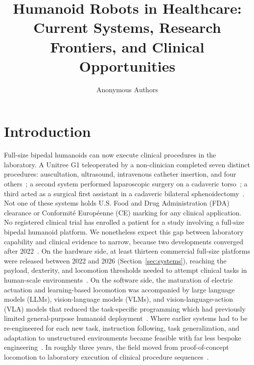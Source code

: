 \documentclass[acmsmall]{acmart}
\title{Humanoid Robots in Healthcare: Current Systems, Research Frontiers,
       and Clinical Opportunities}
\author{Anonymous Authors}
\begin{document}
\maketitle


\section{Introduction}
\label{sec:intro}

Full-size bipedal humanoids can now execute clinical procedures in the
laboratory. A Unitree G1 teleoperated by a non-clinician completed seven
distinct procedures: auscultation, ultrasound, intravenous catheter insertion,
and four others~\cite{atar2025humanoids}; a second system performed
laparoscopic surgery on a cadaveric torso~\cite{liang2025lapsurgie}; a third
acted as a surgical first assistant in a cadaveric bilateral
sphenoidectomy~\cite{cho2026humanoid}. Not one of these systems holds U.S. Food and Drug Administration (FDA)
clearance or Conformit\'{e} Europ\'{e}enne (CE) marking for any clinical
application. No registered clinical
trial has enrolled a patient for a study involving a full-size bipedal humanoid
platform. We nonetheless expect this gap between laboratory capability and
clinical evidence to narrow, because two developments converged after
2022~\cite{gu2025humanoid,cao2025humanoid}. On the hardware side, at least
thirteen commercial full-size platforms were released between 2022 and 2026
(Section~\ref{sec:systems}), reaching the payload, dexterity, and locomotion
thresholds needed to attempt clinical tasks in human-scale
environments~\cite{ifr2025humanoid,unitree2024g1,figureai2024unveils}. On the
software side, the maturation of electric actuation and learning-based
locomotion was accompanied by large language models (LLMs), vision-language
models (VLMs), and vision-language-action (VLA) models that reduced the
task-specific programming which had previously limited general-purpose humanoid
deployment~\cite{firoozi2025foundation,kawaharazuka2024realworld,kim2024survey}.
Where earlier systems had to be re-engineered for each new task, instruction
following, task generalization, and adaptation to unstructured environments
became feasible with far less bespoke
engineering~\cite{argall2009survey,ravichandar2020recent}. In roughly three
years, the field moved from proof-of-concept locomotion to laboratory execution
of clinical procedure
sequences~\cite{radosavovic2024realworld,atar2025humanoids,cho2026humanoid}.
\end{document}
